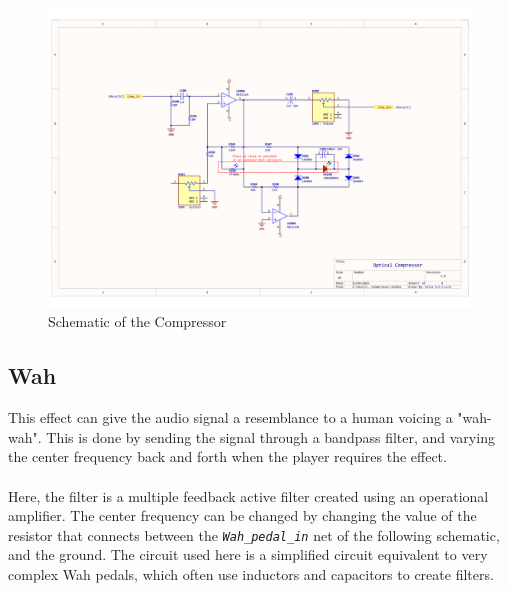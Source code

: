 \documentclass{article}
\begin{document}
                \begin{figure}
                    \centering
                    \includegraphics[scale=0.4]{compressor.png}
                    \caption{Schematic of the Compressor}
                    \label{fig:enter-label}
                \end{figure}

            \subsection{Wah}
                This effect can give the audio signal a resemblance to a human voicing a "wah-wah". This is done by sending the signal through a bandpass filter, and varying the center frequency back and forth when the player requires the effect.\\\\
                Here, the filter is a multiple feedback active filter created using an operational amplifier. The center frequency can be changed by changing the value of the resistor that connects between the \textit{\texttt{Wah\_pedal\_in}} net of the following schematic, and the ground. The circuit used here is a simplified circuit equivalent to very complex Wah pedals, which often use inductors and capacitors to create filters.\\\\
                
\end{document}
